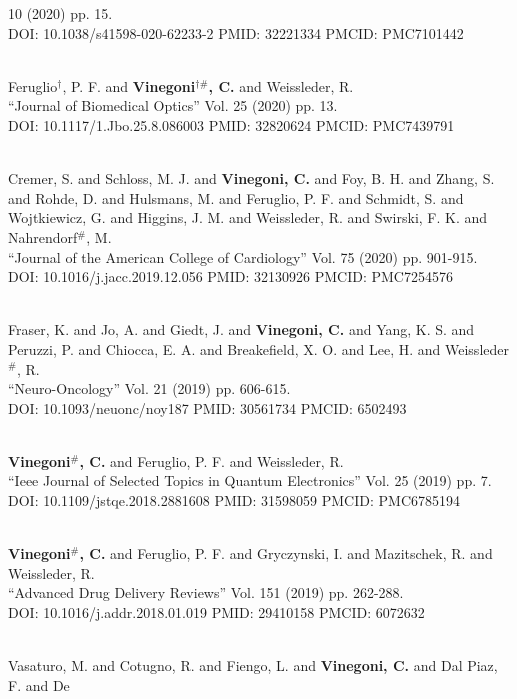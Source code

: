 10 (2020) pp. 15. \\ DOI: 10.1038/s41598-020-62233-2 PMID: 32221334 PMCID: PMC7101442\item {} \\ Feruglio$^\dag$, P. F. and {\bf Vinegoni$^{\dag \#}$, C.} and Weissleder, R. \\ ``Journal of Biomedical Optics'' Vol. 25 (2020) pp. 13. \\ DOI: 10.1117/1.Jbo.25.8.086003 PMID: 32820624 PMCID: PMC7439791\item {} \\ Cremer, S. and Schloss, M. J. and {\bf Vinegoni, C.} and Foy, B. H. and Zhang, S. and Rohde, D. and Hulsmans, M. and Feruglio, P. F. and Schmidt, S. and Wojtkiewicz, G. and Higgins, J. M. and Weissleder, R. and Swirski, F. K. and Nahrendorf$^\#$, M. \\ ``Journal of the American College of Cardiology'' Vol. 75 (2020) pp. 901-915. \\ DOI: 10.1016/j.jacc.2019.12.056 PMID: 32130926 PMCID: PMC7254576\item {} \\ Fraser, K. and Jo, A. and Giedt, J. and {\bf Vinegoni, C.} and Yang, K. S. and Peruzzi, P. and Chiocca, E. A. and Breakefield, X. O. and Lee, H. and Weissleder$^\#$, R. \\ ``Neuro-Oncology'' Vol. 21 (2019) pp. 606-615. \\ DOI: 10.1093/neuonc/noy187 PMID: 30561734 PMCID: 6502493\item {} \\ {\bf Vinegoni$^\#$, C.} and Feruglio, P. F. and Weissleder, R. \\ ``Ieee Journal of Selected Topics in Quantum Electronics'' Vol. 25 (2019) pp. 7. \\ DOI: 10.1109/jstqe.2018.2881608 PMID: 31598059 PMCID: PMC6785194\item {} \\ {\bf Vinegoni$^\#$, C.} and Feruglio, P. F. and Gryczynski, I. and Mazitschek, R. and Weissleder, R. \\ ``Advanced Drug Delivery Reviews'' Vol. 151 (2019) pp. 262-288. \\ DOI: 10.1016/j.addr.2018.01.019 PMID: 29410158 PMCID: 6072632\item {} \\ Vasaturo, M. and Cotugno, R. and Fiengo, L. and {\bf Vinegoni, C.} and Dal Piaz, F. and De 